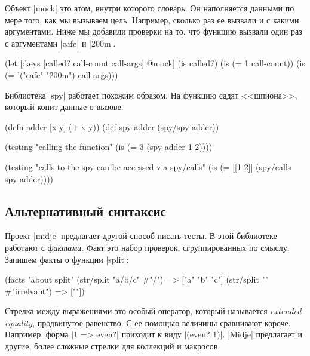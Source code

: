 Объект \spverb|mock| это атом, внутри которого словарь. Он наполняется данными
по мере того, как мы вызываем цель. Например, сколько раз ее вызвали и с какими
аргументами. Ниже мы добавили проверки на то, что функцию вызвали один раз с
аргументами \spverb|cafe| и \spverb|200m|.

\begin{english}
  \begin{clojure}
(let [{:keys [called? call-count call-args]} @mock]
  (is called?)
  (is (= 1 call-count))
  (is (= '("cafe" "200m") call-args)))
  \end{clojure}
\end{english}

Библиотека \spverb|spy|
работает похожим образом. На функцию садят <<шпиона>>, который копит данные о
вызове.

\begin{english}
  \begin{clojure}
(defn adder [x y] (+ x y))
(def spy-adder (spy/spy adder))

(testing "calling the function"
  (is (= 3 (spy-adder 1 2))))

(testing "calls to the spy can be accessed via spy/calls"
  (is (= [[1 2]] (spy/calls spy-adder))))
  \end{clojure}
\end{english}

\subsection{Альтернативный синтаксис}

Проект \spverb|midje| предлагает другой
способ писать тесты. В этой библиотеке работают с \emph{фактами}. Факт это набор
проверок, сгруппированных по смыслу. Запишем факты о функции \spverb|split|:

\begin{english}
  \begin{clojure}
(facts "about split"
 (str/split "a/b/c" #"/") => ["a" "b" "c"]
 (str/split "" #"irrelvant") => [""])
  \end{clojure}
\end{english}

Стрелка между выражениями это особый оператор, который называется \emph{extended
  equality}, продвинутое равенство. С ее помощью величины сравнивают
короче. Например, форма \spverb|1 => even?| приходит к виду \spverb|(even? 1)|.
\spverb|Midje| предлагает и другие, более сложные стрелки для коллекций и
макросов.

